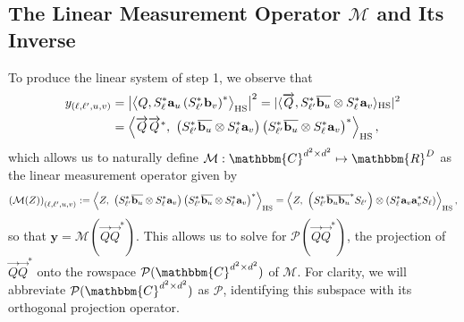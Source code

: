 \documentclass[]{spie}  %
\def \vec{\overrightarrow}
\def \a {\mathbf a}
\def \b {\mathbf b}
\def \bar {\overline}
\def \x {\mathbf x}
\def \y {\mathbf y}
\def \C {\mathbbm{C}}
\def \M {\mathcal{M}}
\def \HS {\rm HS}
\def \P {\mathcal{P}}
\DeclareMathOperator{\Tr}{\rm Trace}
\begin{document}
\subsection{The Linear Measurement Operator $\mathcal{M}$ and Its Inverse}
\label{sec:linear}
To produce the linear system of step 1, we observe that
\begin{align*}%
y_{(\ell,\ell',u,v)} &= \left| \left\langle Q, S^*_{\ell} \a_u \left(S^*_{\ell'} \b_v \right)^* \right\rangle_{\HS} \right|^2 = |\langle \vec{Q}, S_{\ell'}^* \bar{\b_u} \otimes S_{\ell}^* \a_v \rangle_{\HS} |^2 \\%
&= \left\langle  \vec{Q} \vec{Q}^*, ~\left(S_{\ell'}^* \bar{\b_u} \otimes S_{\ell}^* \a_v\right) \left(S_{\ell'}^* \bar{\b_u} \otimes S_{\ell}^* \a_v\right)^* \right\rangle_{\HS},
\end{align*} %
which allows us to naturally define $\mathcal{M}: \mathbbm{C}^{d^2 \times d^2} \mapsto \mathbbm{R}^D$ as the linear measurement operator given by 
\begin{equation}
\left(\mathcal{M}(Z) \right)_{(\ell,\ell',u,v)} := \left\langle  Z, ~\left(S_{\ell'}^* \bar{\b_u} \otimes S_{\ell}^* \a_v\right) \left(S_{\ell'}^* \bar{\b_u} \otimes S_{\ell}^* \a_v\right)^*\right\rangle_{\HS} = \left\langle Z, ~\left(S_{\ell'}^* \bar{\b_u}\bar{\b_u}^* S_{\ell'}\right) \otimes \left(S_\ell^* \a_v \a_v^* S_\ell \right) \right\rangle_{\HS},
\label{Def:Measure_Operator}
\end{equation}
so that $\y = \mathcal{M}(\vec{Q} \vec{Q}^*)$.  This allows us to solve for $\P(\vec{Q} \vec{Q}^*)$, the projection of $\vec{Q} \vec{Q}^*$ onto the rowspace $\P(\C^{d^2 \times d^2})$ of $\M$.  For clarity, we will abbreviate $\P(\C^{d^2 \times d^2})$ as $\P$, identifying this subspace with its orthogonal projection operator.
\end{document}

